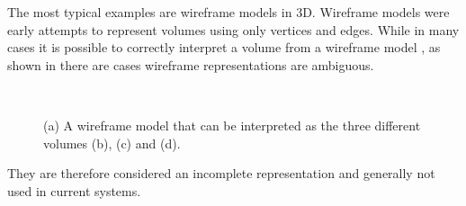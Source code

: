 The most typical examples are wireframe models in 3D.
Wireframe models were early attempts to represent volumes using only vertices and edges.
While in many cases it is possible to correctly interpret a volume from a wireframe model \citep{Brewer86,Hanrahan82}, as shown in  there are cases wireframe representations are ambiguous.
\begin{figure}[tbp]
\centering
{}
\quad
{}
\\
\quad
{}
\caption[A wireframe model can have different interpretations]{(a) A wireframe model that can be interpreted as the three different volumes (b), (c) and (d).}
\label{fig:wireframe}
\end{figure}
They are therefore considered an incomplete representation and generally not used in current systems.

